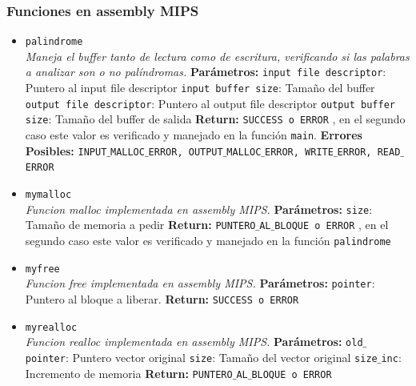 \documentclass[a4paper, 10pt]{article}
\def\code#1{\texttt{#1}}
\begin{document}
			\subsubsection{Funciones en assembly MIPS}		
			\begin{itemize}
			
				\item \code{palindrome}
				\\\textit{Maneja el buffer tanto de lectura como de escritura, verificando si las palabras
				a analizar son o no palíndromas.}
					\subitem \textbf{Parámetros:}
						\subsubitem \code{input file descriptor}: Puntero al input file descriptor
						\subsubitem \code{input buffer size}: Tamaño del buffer
						\subsubitem \code{output file descriptor}: Puntero al output file descriptor
						\subsubitem \code{output buffer size}: Tamaño del buffer de salida
					\subitem \textbf{Return:}
						\subsubitem \code{SUCCESS o ERROR} , en el segundo caso este valor
						es verificado y manejado en la función \code{main}.
					\subitem \textbf{Errores Posibles:}
						\subsubitem \code{INPUT$\_$MALLOC$\_$ERROR, OUTPUT$\_$MALLOC$\_$ERROR, 
						WRITE$\_$ERROR, READ$\_$ERROR}	
				
				\item \code{mymalloc}
				\\\textit{Funcion malloc implementada en assembly MIPS.}
					\subitem \textbf{Parámetros:}
						\subsubitem \code{size}: Tamaño de memoria a pedir
					\subitem \textbf{Return:}
						\subsubitem \code{PUNTERO$\_$AL$\_$BLOQUE o ERROR} , en el segundo caso este valor
						es verificado y manejado en la función \code{palindrome}
				
				\item \code{myfree}
				\\\textit{Funcion free implementada en assembly MIPS.}
					\subitem \textbf{Parámetros:}
						\subsubitem \code{pointer}: Puntero al bloque a liberar.
					\subitem \textbf{Return:}
						\subsubitem \code{SUCCESS o ERROR}
						
				\item \code{myrealloc}
				\\\textit{Funcion realloc implementada en assembly MIPS.}
					\subitem \textbf{Parámetros:}
						\subsubitem \code{old$\_$pointer}: Puntero vector original
						\subsubitem \code{size}: Tamaño del vector original
						\subsubitem \code{size$\_$inc}: Incremento de memoria
					\subitem \textbf{Return:}
						\subsubitem \code{PUNTERO$\_$AL$\_$BLOQUE o ERROR}
						

\end{itemize}
\end{document}
